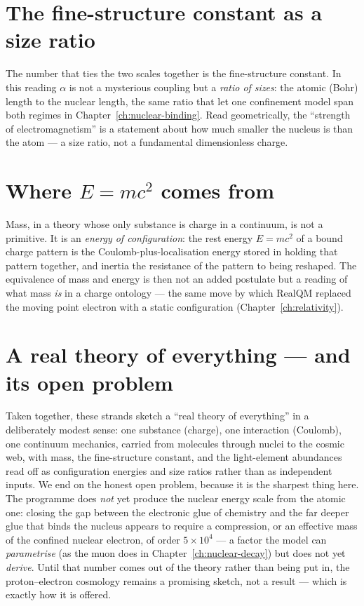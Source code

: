 \section{The fine-structure constant as a size ratio}\label{sec:alpha-ratio}

The number that ties the two scales together is the fine-structure constant. In this reading $\alpha$ is not a
mysterious coupling but a \emph{ratio of sizes}: the atomic (Bohr) length to the nuclear length, the same ratio
that let one confinement model span both regimes in Chapter~\ref{ch:nuclear-binding}. Read geometrically, the
``strength of electromagnetism'' is a statement about how much smaller the nucleus is than the atom --- a
size ratio, not a fundamental dimensionless charge.

\section{Where $E=mc^2$ comes from}\label{sec:emc2}

Mass, in a theory whose only substance is charge in a continuum, is not a primitive. It is an \emph{energy of
configuration}: the rest energy $E=mc^2$ of a bound charge pattern is the Coulomb-plus-localisation energy stored
in holding that pattern together, and inertia the resistance of the pattern to being reshaped. The equivalence of
mass and energy is then not an added postulate but a reading of what mass \emph{is} in a charge ontology --- the
same move by which RealQM replaced the moving point electron with a static configuration (Chapter~\ref{ch:relativity}).

\section{A real theory of everything --- and its open problem}\label{sec:real-toe}

Taken together, these strands sketch a ``real theory of everything'' in a deliberately modest sense: one
substance (charge), one interaction (Coulomb), one continuum mechanics, carried from molecules through nuclei to
the cosmic web, with mass, the fine-structure constant, and the light-element abundances read off as
configuration energies and size ratios rather than as independent inputs. We end on the honest open problem,
because it is the sharpest thing here. The programme does \emph{not} yet produce the nuclear energy scale from the
atomic one: closing the gap between the electronic glue of chemistry and the far deeper glue that binds the
nucleus appears to require a compression, or an effective mass of the confined nuclear electron, of order
$5\times10^4$ --- a factor the model can \emph{parametrise} (as the muon does in Chapter~\ref{ch:nuclear-decay})
but does not yet \emph{derive}. Until that number comes out of the theory rather than being put in, the
proton--electron cosmology remains a promising sketch, not a result --- which is exactly how it is offered.
